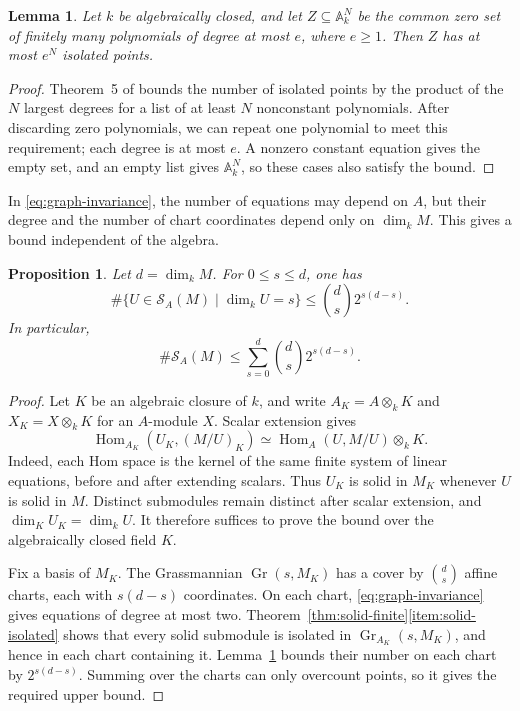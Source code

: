 \documentclass[a4paper,reqno,10pt]{amsart}
\newtheorem{proposition}[theorem]{Proposition}
\newtheorem{lemma}[theorem]{Lemma}
\theoremstyle{definition}
\numberwithin{equation}{section}
\newcommand{\kfield}{k}
\newcommand{\Hom}{\operatorname{Hom}}
\newcommand{\Gr}{\operatorname{Gr}}
\newcommand{\Sol}{\mathcal S}
\begin{document}
\begin{lemma}\label{lem:bezout}
Let $\kfield$ be algebraically closed, and let
$Z\subseteq\mathbb A^N_{\kfield}$ be the common zero set of finitely
many polynomials of degree at most $e$, where $e\geq1$. Then $Z$ has
at most $e^N$ isolated points.
\end{lemma}

\begin{proof}
Theorem~5 of \cite{TaoBezout} bounds the number of isolated points by
the product of the $N$ largest degrees for a list of at least $N$
nonconstant polynomials. After discarding zero polynomials, we can
repeat one polynomial to meet this requirement; each degree is at most
$e$. A nonzero constant equation gives the empty set, and an empty list
gives $\mathbb A^N_k$, so these cases also satisfy the bound.
\end{proof}

In \eqref{eq:graph-invariance}, the number of equations may depend
on $A$, but their degree and the number of chart coordinates depend
only on $\dim_\kfield M$. This gives a bound independent of the algebra.

\begin{proposition}\label{prop:solid-bound}
Let $d=\dim_{\kfield}M$. For $0\leq s\leq d$, one has
\[
 \#\{U\in\Sol_A(M)\mid\dim_{\kfield}U=s\}
 \leq \binom ds 2^{s(d-s)}.
\]
In particular,
\[
 \#\Sol_A(M)\leq\sum_{s=0}^d\binom ds 2^{s(d-s)}.
\]
\end{proposition}

\begin{proof}
Let $K$ be an algebraic closure of $k$, and write $A_K=A\otimes_k K$
and $X_K=X\otimes_k K$ for an $A$-module $X$. Scalar extension gives
\[
 \Hom_{A_K}(U_K,(M/U)_K)
   \simeq \Hom_A(U,M/U)\otimes_k K.
\]
Indeed, each Hom space is the kernel of the same finite system of
linear equations, before and after extending scalars. Thus $U_K$ is
solid in $M_K$ whenever $U$ is solid in $M$. Distinct submodules remain
distinct after scalar extension, and $\dim_K U_K=\dim_k U$.
It therefore suffices to prove the bound over the algebraically closed
field $K$.

Fix a basis of $M_K$. The Grassmannian $\Gr(s,M_K)$ has a cover by
$\binom ds$ affine charts, each with $s(d-s)$ coordinates.
On each chart, \eqref{eq:graph-invariance} gives equations of degree
at most two. Theorem~\ref{thm:solid-finite}\ref{item:solid-isolated} shows that every solid
submodule is isolated in $\Gr_{A_K}(s,M_K)$, and hence in each chart
containing it.
Lemma~\ref{lem:bezout} bounds their number
on each chart by $2^{s(d-s)}$. Summing over the charts can only
overcount points, so it gives the required upper bound.
\end{proof}
\end{document}
